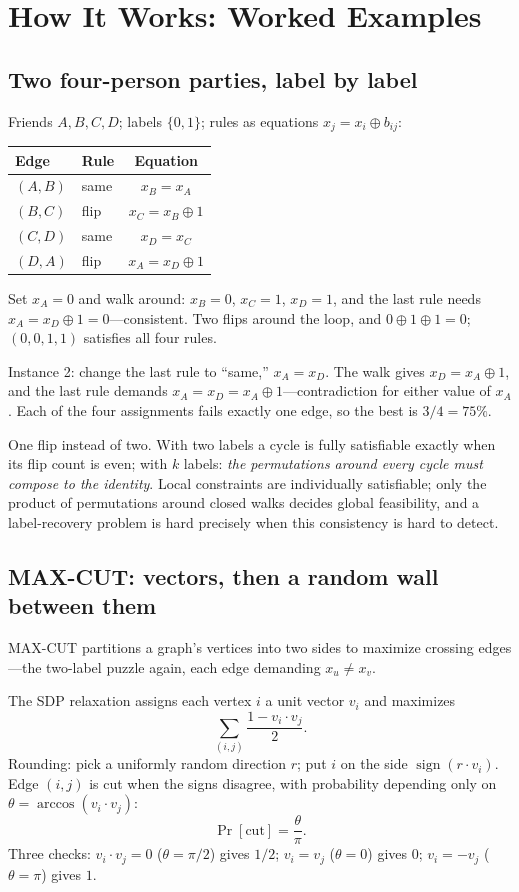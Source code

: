 \section{How It Works: Worked Examples}
\subsection{Two four-person parties, label by label}
Friends $A,B,C,D$; labels $\{0,1\}$; rules as equations $x_j=x_i\oplus b_{ij}$:
\begin{center}
\begin{tabular}{llc}
\toprule
Edge & Rule & Equation \\
\midrule
$(A,B)$ & same & $x_B=x_A$ \\
$(B,C)$ & flip & $x_C=x_B\oplus1$ \\
$(C,D)$ & same & $x_D=x_C$ \\
$(D,A)$ & flip & $x_A=x_D\oplus1$ \\
\bottomrule
\end{tabular}
\end{center}
Set $x_A=0$ and walk around: $x_B=0$, $x_C=1$, $x_D=1$, and the last rule needs $x_A=x_D\oplus1=0$---consistent. Two flips around the loop, and $0\oplus1\oplus1=0$; $(0,0,1,1)$ satisfies all four rules.

Instance 2: change the last rule to ``same,'' $x_A=x_D$. The walk gives $x_D=x_A\oplus1$, and the last rule demands $x_A=x_D=x_A\oplus1$---contradiction for either value of $x_A$. Each of the four assignments fails exactly one edge, so the best is $3/4=75\%$.

One flip instead of two. With two labels a cycle is fully satisfiable exactly when its flip count is even; with $k$ labels: \emph{the permutations around every cycle must compose to the identity}. Local constraints are individually satisfiable; only the product of permutations around closed walks decides global feasibility, and a label-recovery problem is hard precisely when this consistency is hard to detect.

\subsection{MAX-CUT: vectors, then a random wall between them}
MAX-CUT partitions a graph's vertices into two sides to maximize crossing edges---the two-label puzzle again, each edge demanding $x_u\ne x_v$.

The SDP relaxation assigns each vertex $i$ a unit vector $v_i$ and maximizes
\[
\sum_{(i,j)} \frac{1-v_i\cdot v_j}{2}.
\]
Rounding: pick a uniformly random direction $r$; put $i$ on the side $\operatorname{sign}(r\cdot v_i)$. Edge $(i,j)$ is cut when the signs disagree, with probability depending only on $\theta=\arccos(v_i\cdot v_j)$:
\[
\Pr[\text{cut}]=\frac{\theta}{\pi}.
\]
Three checks: $v_i\cdot v_j=0$ ($\theta=\pi/2$) gives $1/2$; $v_i=v_j$ ($\theta=0$) gives $0$; $v_i=-v_j$ ($\theta=\pi$) gives $1$.

